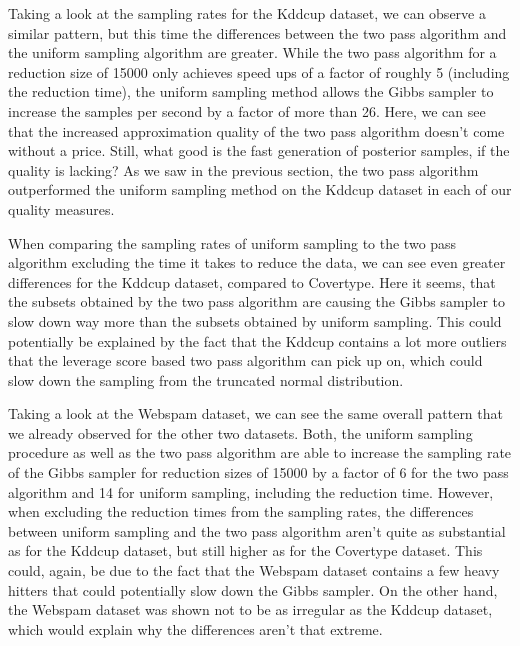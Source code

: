 Taking a look at the sampling rates for the Kddcup dataset,
we can observe a similar pattern,
but this time the differences between the two pass algorithm
and the uniform sampling algorithm are greater. While the
two pass algorithm for a reduction size of 15000
only achieves speed ups of a factor of
roughly 5 (including the reduction time), the uniform sampling
method allows the Gibbs sampler to increase the samples
per second by a factor of more than 26.
Here, we can see that the increased approximation quality of
the two pass algorithm doesn't come without a price. Still,
what good is the fast generation of posterior samples, if the
quality is lacking? As we saw in the previous section, the
two pass algorithm outperformed the uniform sampling method
on the Kddcup dataset in each of our quality measures.

When comparing the sampling rates of uniform sampling to the
two pass algorithm excluding the time it takes to reduce the data,
we can see even greater differences for the Kddcup dataset,
compared to Covertype.
Here it seems, that the subsets obtained by the two pass algorithm
are causing the Gibbs sampler to slow down way more than the
subsets obtained by uniform sampling.
This could potentially be explained by the fact that the Kddcup
contains a lot more outliers that the leverage score based two
pass algorithm can pick up on, which could slow down the
sampling from the truncated normal distribution.

Taking a look at the Webspam dataset, we can
see the same overall pattern that we already observed for the
other two datasets. Both, the uniform sampling procedure as well as
the two pass algorithm are able to increase the sampling rate
of the Gibbs sampler for reduction sizes of 15000 by a factor
of 6 for the two pass algorithm and 14 for uniform sampling,
including the reduction time.
However, when excluding the reduction times from the sampling
rates, the differences between uniform sampling and the two
pass algorithm aren't quite as substantial as for the Kddcup dataset,
but still higher as for the Covertype dataset.
This could, again, be due to the fact that the Webspam dataset
contains a few heavy hitters that could potentially slow down
the Gibbs sampler. On the other hand, the Webspam dataset was
shown not to be as irregular as the Kddcup dataset, which would
explain why the differences aren't that extreme.

